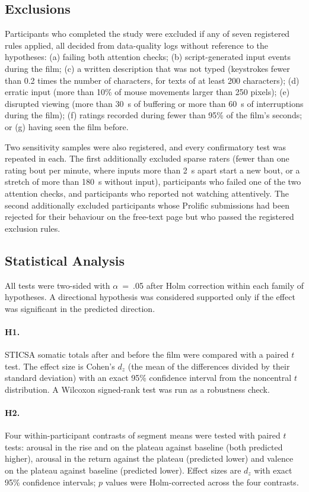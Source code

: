 \documentclass[man,floatsintext,12pt,donotrepeattitle]{apa7}
\begin{document}
\subsection{Exclusions}

Participants who completed the study were excluded if any of seven registered rules applied, all decided from
data-quality logs without reference to the hypotheses: (a) failing both attention checks; (b) script-generated input
events during the film; (c) a written description that was not typed (keystrokes fewer than 0.2 times the number of
characters, for texts of at least 200 characters); (d) erratic input (more than 10\% of mouse movements larger than
250 pixels); (e) disrupted viewing (more than 30~s of buffering or more than 60~s of interruptions during the film);
(f) ratings recorded during fewer than 95\% of the film's seconds; or (g) having seen the film before.

Two sensitivity samples were also registered, and every confirmatory test was repeated in each. The first
additionally excluded sparse raters (fewer than one rating bout per minute, where inputs more than 2~s apart start a
new bout, or a stretch of more than 180~s without input), participants who failed one of the two attention checks,
and participants who reported not watching attentively. The second additionally excluded participants whose Prolific
submissions had been rejected for their behaviour on the free-text page but who passed the registered exclusion
rules.

\subsection{Statistical Analysis}

All tests were two-sided with $\alpha$~=~.05 after Holm correction within each family of hypotheses. A directional
hypothesis was considered supported only if the effect was significant in the predicted direction.

\paragraph{H1.} STICSA somatic totals after and before the film were compared with a paired $t$ test. The effect size
is Cohen's $d_z$ (the mean of the differences divided by their standard deviation) with an exact 95\% confidence
interval from the noncentral $t$ distribution. A Wilcoxon signed-rank test was run as a robustness check.

\paragraph{H2.} Four within-participant contrasts of segment means were tested with paired $t$ tests: arousal in the
rise and on the plateau against baseline (both predicted higher), arousal in the return against the plateau
(predicted lower) and valence on the plateau against baseline (predicted lower). Effect sizes are $d_z$ with exact
95\% confidence intervals; $p$ values were Holm-corrected across the four contrasts.
\end{document}
